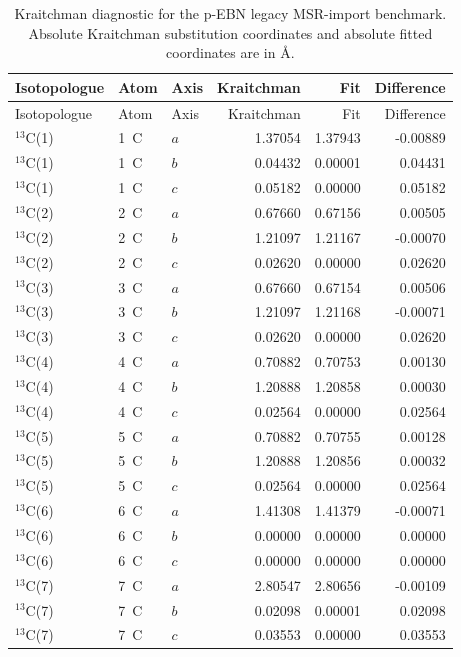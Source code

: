 \begin{longtable}{lllrrr}
\caption{Kraitchman diagnostic for the p-EBN legacy MSR-import benchmark. Absolute Kraitchman substitution coordinates and absolute fitted coordinates are in \AA.}\label{tab:si-p-ebn-kraitchman}\\
\toprule
Isotopologue & Atom & Axis & Kraitchman & Fit & Difference \\
\midrule
\endfirsthead
\toprule
Isotopologue & Atom & Axis & Kraitchman & Fit & Difference \\
\midrule
\endhead
$^{13}$C(1) & 1~C & $a$ & 1.37054 & 1.37943 & -0.00889 \\
$^{13}$C(1) & 1~C & $b$ & 0.04432 & 0.00001 & 0.04431 \\
$^{13}$C(1) & 1~C & $c$ & 0.05182 & 0.00000 & 0.05182 \\
$^{13}$C(2) & 2~C & $a$ & 0.67660 & 0.67156 & 0.00505 \\
$^{13}$C(2) & 2~C & $b$ & 1.21097 & 1.21167 & -0.00070 \\
$^{13}$C(2) & 2~C & $c$ & 0.02620 & 0.00000 & 0.02620 \\
$^{13}$C(3) & 3~C & $a$ & 0.67660 & 0.67154 & 0.00506 \\
$^{13}$C(3) & 3~C & $b$ & 1.21097 & 1.21168 & -0.00071 \\
$^{13}$C(3) & 3~C & $c$ & 0.02620 & 0.00000 & 0.02620 \\
$^{13}$C(4) & 4~C & $a$ & 0.70882 & 0.70753 & 0.00130 \\
$^{13}$C(4) & 4~C & $b$ & 1.20888 & 1.20858 & 0.00030 \\
$^{13}$C(4) & 4~C & $c$ & 0.02564 & 0.00000 & 0.02564 \\
$^{13}$C(5) & 5~C & $a$ & 0.70882 & 0.70755 & 0.00128 \\
$^{13}$C(5) & 5~C & $b$ & 1.20888 & 1.20856 & 0.00032 \\
$^{13}$C(5) & 5~C & $c$ & 0.02564 & 0.00000 & 0.02564 \\
$^{13}$C(6) & 6~C & $a$ & 1.41308 & 1.41379 & -0.00071 \\
$^{13}$C(6) & 6~C & $b$ & 0.00000 & 0.00000 & 0.00000 \\
$^{13}$C(6) & 6~C & $c$ & 0.00000 & 0.00000 & 0.00000 \\
$^{13}$C(7) & 7~C & $a$ & 2.80547 & 2.80656 & -0.00109 \\
$^{13}$C(7) & 7~C & $b$ & 0.02098 & 0.00001 & 0.02098 \\
$^{13}$C(7) & 7~C & $c$ & 0.03553 & 0.00000 & 0.03553 \\

\end{longtable}
